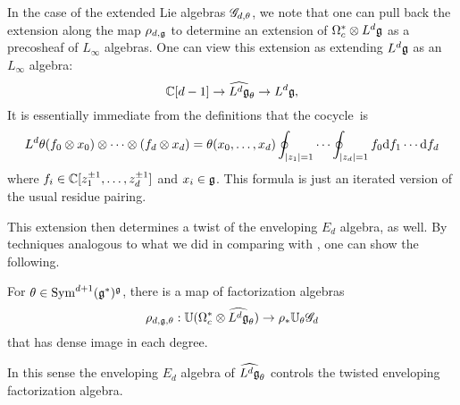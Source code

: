 In the case of the extended Lie algebras $\mathscr G_{d,\theta}$, we note that one can pull back the extension along the map $\rho_{d,\mathfrak g}$ to determine an extension of $\Omega^*_c \otimes L^d\mathfrak g$ as a precosheaf of $L_\infty$ algebras.
One can view this extension as extending $L^d\mathfrak g$ as an $L_\infty$ algebra:
\[
\mathbb C[d-1] \to \widehat{L^d \mathfrak g}_\theta \to L^d \mathfrak g,
\]
It is essentially immediate from the definitions that the cocycle~is
\[
L^d \theta(f_0 \otimes x_0)\otimes \cdots \otimes (f_d \otimes x_d) = \theta(x_0,\ldots,x_d)  \oint_{|z_1| = 1} \cdots \oint_{|z_d| = 1} f_0 {\rm d} f_1 \cdots {\rm d} f_d
\]
where $f_i \in \mathbb C[z_1^{\pm 1}, \ldots, z_d^{\pm 1}]$ and $x_i \in \mathfrak g$.
This formula is just an iterated version of the usual residue pairing.

This extension then determines a twist of the enveloping $E_d$ algebra, as well.
By techniques analogous to what we did in comparing with \cite{FHK},
one can show the following.

\begin{prop}
For $\theta \in {\rm Sym}^{d+1}(\mathfrak g^*)^\mathfrak g$,
there is a map of factorization algebras
\[
\rho_{d,\mathfrak g,\theta}: \mathbb U(\Omega^*_c \otimes \widehat{L^d \mathfrak g}_\theta) \to \rho_* \mathbb U_\theta \mathscr G_d
\]
that has dense image in each degree.
\end{prop}

In this sense the enveloping $E_d$ algebra of $\widehat{L^d \mathfrak g}_\theta$ controls the twisted enveloping factorization algebra.